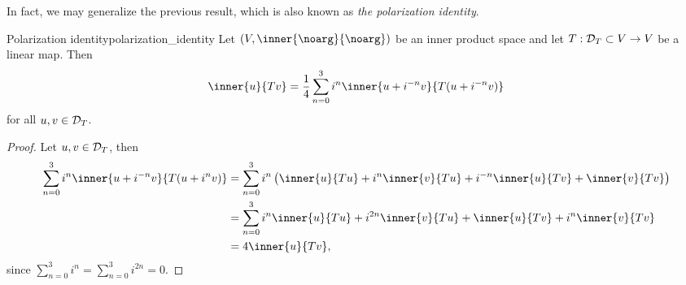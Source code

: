 In fact, we may generalize the previous result, which is also known as \emph{the polarization identity}.
\begin{proposition}{Polarization identity}{polarization_identity}
    Let \((V, \inner{\noarg}{\noarg})\) be an inner product space and let \(T : \mathcal{D}_{T}\subset V \to V\) be a linear map. Then
    \begin{equation*}
        \inner{u}{Tv} = \frac14\sum_{n=0}^3 i^{n}\inner{u + i^{-n}v}{T(u + i^{-n}v)}
    \end{equation*}
    for all \(u, v \in \mathcal{D}_{T}\).
\end{proposition}
\begin{proof}
    Let \(u, v \in \mathcal{D}_{T}\), then
    \begin{align*}
        \sum_{n=0}^3 i^{n} \inner{u+i^{-n}v}{T(u + i^{n}v)} &= \sum_{n=0}^3 i^n \left(\inner{u}{Tu} + i^n\inner{v}{Tu} + i^{-n}\inner{u}{Tv} + \inner{v}{Tv}\right)\\
                                                            &= \sum_{n=0}^3 i^n\inner{u}{Tu} + i^{2n}\inner{v}{Tu} + \inner{u}{Tv} + i^{n}\inner{v}{Tv}\\
                                                            &= 4\inner{u}{Tv},
    \end{align*}
    since \(\sum_{n=0}^3 i^n = \sum_{n=0}^3 i^{2n} = 0\).
\end{proof}

